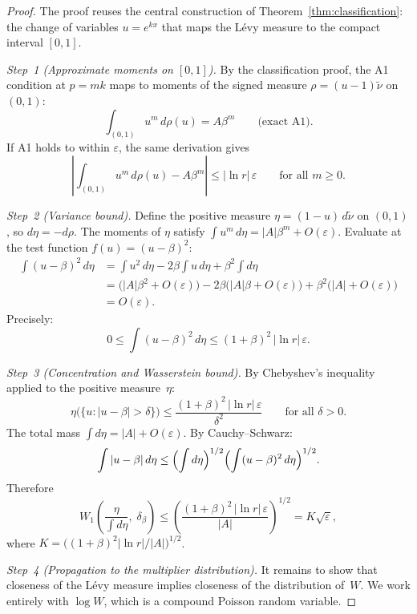 \documentclass[12pt]{amsart}
\theoremstyle{definition}
\theoremstyle{remark}
\begin{document}
\begin{proof}
The proof reuses the central construction of
Theorem~\ref{thm:classification}: the change of variables $u = e^{kx}$
that maps the L\'evy measure to the compact interval $[0,1]$.

\textit{Step~1 (Approximate moments on $[0,1]$).}  By the
classification proof, the A1 condition at $p = mk$ maps to moments of
the signed measure $\rho = (u-1)\tilde\nu$ on $(0,1)$:
\[
  \int_{(0,1)} u^m\,d\rho(u) = A\beta^m
  \qquad\text{(exact A1).}
\]
If A1 holds to within $\varepsilon$, the same derivation gives
\[
  \left|\int_{(0,1)} u^m\,d\rho(u) - A\beta^m\right|
  \leq |\ln r|\,\varepsilon
  \qquad\text{for all } m \geq 0.
\]

\textit{Step~2 (Variance bound).}  Define the positive measure $\eta
= (1-u)\,d\tilde\nu$ on $(0,1)$, so $d\eta = -d\rho$.  The moments
of $\eta$ satisfy $\int u^m\,d\eta = |A|\beta^m + O(\varepsilon)$.
Evaluate at the test function $f(u) = (u-\beta)^2$:
\begin{align*}
  \int(u-\beta)^2\,d\eta
  &= \int u^2\,d\eta - 2\beta\int u\,d\eta + \beta^2\int d\eta \\
  &= \bigl(|A|\beta^2 + O(\varepsilon)\bigr)
    - 2\beta\bigl(|A|\beta + O(\varepsilon)\bigr)
    + \beta^2\bigl(|A| + O(\varepsilon)\bigr) \\
  &= O(\varepsilon).
\end{align*}
Precisely:
\[
  0 \leq \int(u-\beta)^2\,d\eta
  \leq (1+\beta)^2\,|\ln r|\,\varepsilon.
\]

\textit{Step~3 (Concentration and Wasserstein bound).}  By
Chebyshev's inequality applied to the positive measure~$\eta$:
\[
  \eta\bigl(\{u : |u-\beta| > \delta\}\bigr)
  \leq \frac{(1+\beta)^2\,|\ln r|\,\varepsilon}{\delta^2}
  \qquad\text{for all } \delta > 0.
\]
The total mass $\int d\eta = |A| + O(\varepsilon)$.  By
Cauchy--Schwarz:
\[
  \int|u-\beta|\,d\eta
  \leq \Bigl(\int d\eta\Bigr)^{1/2}
       \Bigl(\int(u-\beta)^2\,d\eta\Bigr)^{1/2}.
\]
Therefore
\[
  W_1\!\left(\frac{\eta}{\int d\eta},\;\delta_\beta\right)
  \leq \left(\frac{(1+\beta)^2\,|\ln r|\,\varepsilon}{|A|}
       \right)^{\!1/2}
  = K\sqrt{\varepsilon},
\]
where $K = \bigl((1+\beta)^2|\ln r|/|A|\bigr)^{1/2}$.

\textit{Step~4 (Propagation to the multiplier distribution).}  It
remains to show that closeness of the L\'evy measure implies closeness
of the distribution of~$W$.  We work entirely with $\log W$, which is
a compound Poisson random variable.


\end{proof}
\end{document}
